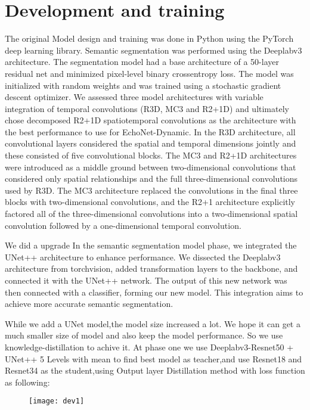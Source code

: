 \vfill
\section{Development and training}

The original Model design and training was done in Python using the PyTorch deep learning library. Semantic segmentation was performed using the Deeplabv3 architecture. The segmentation model had a base architecture of a 50-layer residual net and minimized pixel-level binary crossentropy loss. The model was initialized with random weights and was trained using a stochastic gradient descent optimizer. We assessed three model architectures with variable integration of temporal convolutions (R3D, MC3 and R2+1D) and ultimately chose decomposed R2+1D spatiotemporal convolutions as the architecture with the best performance to use for EchoNet-Dynamic. In the R3D architecture, all convolutional layers considered the spatial and temporal dimensions jointly and these consisted of five convolutional blocks. The MC3 and R2+1D architectures were introduced as a middle ground between two-dimensional convolutions that considered only spatial relationships and the full three-dimensional convolutions used by R3D. The MC3 architecture replaced the convolutions in the final three blocks with two-dimensional convolutions, and the R2+1 architecture explicitly factored all of the three-dimensional convolutions into a two-dimensional spatial convolution followed by a one-dimensional temporal convolution.

We did a upgrade In the semantic segmentation model phase, we integrated the UNet++ architecture to enhance performance. We dissected the Deeplabv3 architecture from torchvision, added transformation layers to the backbone, and connected it with the UNet++ network. The output of this new network was then connected with a classifier, forming our new model. This integration aims to achieve more accurate semantic segmentation.

While we add a UNet model,the model size increased a lot. We hope it can get a much smaller size of model and also keep the model performance. So we use knowledge-distillation to achive it.  At phase one we use Deeplabv3-Resnet50 + UNet++ 5 Levels with mean to find best model as teacher,and use Resnet18 and Resnet34 as the student,using Output layer Distillation method with loss function as following:

\begin{figure}[h]
\centering
\texttt{[image: dev1]}
\label{dev0}
\end{figure}

